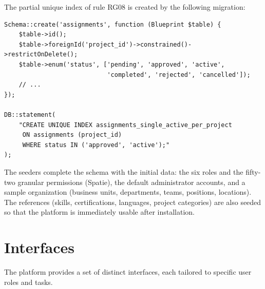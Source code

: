 \documentclass{bts-report}
\begin{document}
The partial unique index of rule RG08 is created by the following migration:

\begin{verbatim}
Schema::create('assignments', function (Blueprint $table) {
    $table->id();
    $table->foreignId('project_id')->constrained()->restrictOnDelete();
    $table->enum('status', ['pending', 'approved', 'active',
                            'completed', 'rejected', 'cancelled']);
    // ...
});

DB::statement(
    "CREATE UNIQUE INDEX assignments_single_active_per_project
     ON assignments (project_id)
     WHERE status IN ('approved', 'active');"
);
\end{verbatim}

The seeders complete the schema with the initial data: the six roles and the fifty-two granular permissions (Spatie), the default administrator accounts, and a sample organization (business units, departments, teams, positions, locations). The references (skills, certifications, languages, project categories) are also seeded so that the platform is immediately usable after installation.

\section{Interfaces}

The platform provides a set of distinct interfaces, each tailored to specific user roles and tasks.
\end{document}
